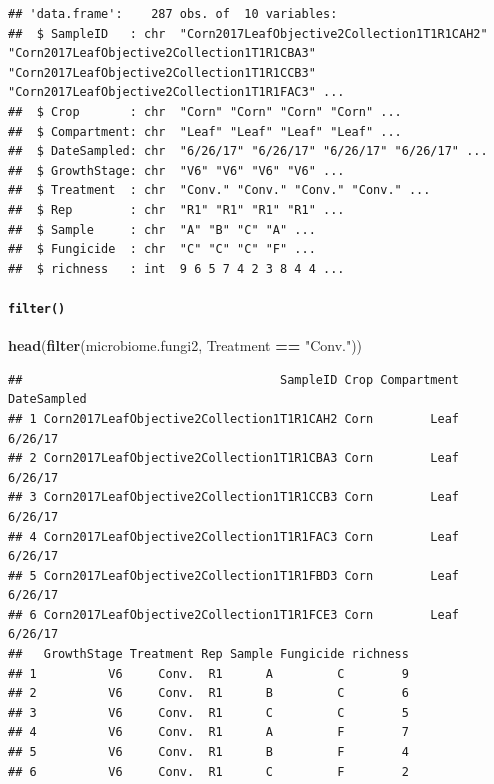 \documentclass[
]{article}
\newenvironment{Shaded}{\begin{snugshade}}{\end{snugshade}}
\newcommand{\FunctionTok}[1]{\textcolor[rgb]{0.13,0.29,0.53}{\textbf{#1}}}
\newcommand{\NormalTok}[1]{#1}
\newcommand{\SpecialCharTok}[1]{\textcolor[rgb]{0.81,0.36,0.00}{\textbf{#1}}}
\newcommand{\StringTok}[1]{\textcolor[rgb]{0.31,0.60,0.02}{#1}}
\begin{document}
\begin{verbatim}
## 'data.frame':    287 obs. of  10 variables:
##  $ SampleID   : chr  "Corn2017LeafObjective2Collection1T1R1CAH2" "Corn2017LeafObjective2Collection1T1R1CBA3" "Corn2017LeafObjective2Collection1T1R1CCB3" "Corn2017LeafObjective2Collection1T1R1FAC3" ...
##  $ Crop       : chr  "Corn" "Corn" "Corn" "Corn" ...
##  $ Compartment: chr  "Leaf" "Leaf" "Leaf" "Leaf" ...
##  $ DateSampled: chr  "6/26/17" "6/26/17" "6/26/17" "6/26/17" ...
##  $ GrowthStage: chr  "V6" "V6" "V6" "V6" ...
##  $ Treatment  : chr  "Conv." "Conv." "Conv." "Conv." ...
##  $ Rep        : chr  "R1" "R1" "R1" "R1" ...
##  $ Sample     : chr  "A" "B" "C" "A" ...
##  $ Fungicide  : chr  "C" "C" "C" "F" ...
##  $ richness   : int  9 6 5 7 4 2 3 8 4 4 ...
\end{verbatim}

\paragraph{\texorpdfstring{\texttt{filter()}}{filter()}}\label{filter}

\begin{Shaded}
\begin{Highlighting}[]
\FunctionTok{head}\NormalTok{(}\FunctionTok{filter}\NormalTok{(microbiome.fungi2, Treatment }\SpecialCharTok{==} \StringTok{"Conv."}\NormalTok{))}
\end{Highlighting}
\end{Shaded}

\begin{verbatim}
##                                    SampleID Crop Compartment DateSampled
## 1 Corn2017LeafObjective2Collection1T1R1CAH2 Corn        Leaf     6/26/17
## 2 Corn2017LeafObjective2Collection1T1R1CBA3 Corn        Leaf     6/26/17
## 3 Corn2017LeafObjective2Collection1T1R1CCB3 Corn        Leaf     6/26/17
## 4 Corn2017LeafObjective2Collection1T1R1FAC3 Corn        Leaf     6/26/17
## 5 Corn2017LeafObjective2Collection1T1R1FBD3 Corn        Leaf     6/26/17
## 6 Corn2017LeafObjective2Collection1T1R1FCE3 Corn        Leaf     6/26/17
##   GrowthStage Treatment Rep Sample Fungicide richness
## 1          V6     Conv.  R1      A         C        9
## 2          V6     Conv.  R1      B         C        6
## 3          V6     Conv.  R1      C         C        5
## 4          V6     Conv.  R1      A         F        7
## 5          V6     Conv.  R1      B         F        4
## 6          V6     Conv.  R1      C         F        2
\end{verbatim}
\end{document}
